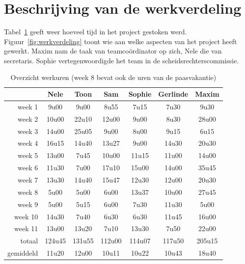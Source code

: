 \documentclass[eind]{penoverslag}
\begin{document}
\section{Beschrijving van de werkverdeling}
\label{Asec:werkverdeling}
Tabel~\ref{tab:werkuren} geeft weer hoeveel tijd in het project gestoken werd. Figuur~\ref{fig:werkverdeling} toont wie aan welke aspecten van het project heeft gewerkt.
Maxim nam de taak van teamco\"ordinator op zich, Nele die van secretaris. Sophie vertegenwoordigde het team in de scheidsrechterscommissie.

\begin{table}[h]
\begin{center}
    \begin{tabular}{ r | c  c  c  c  c  c}
     & Nele & Toon & Sam & Sophie & Gerlinde & Maxim \\ \hline
    week 1 & 9u00 & 9u00 & 8u55 & 7u15 & 7u30 & 9u30\\
   	week 2 & 10u00 & 22u10 & 12u00 & 9u00 & 8u30 & 28u00\\
	week 3 & 14u00 & 25u05 & 9u00 & 8u00 & 9u15 & 6u15\\
	week 4 & 16u15 & 14u40 & 13u27 & 9u00 & 14u30 & 20u30\\
	week 5 & 13u00 & 7u45 & 10u00 & 11u15 & 11u00 & 14u00\\
	week 6 & 11u30 & 7u00 & 17u10 & 15u00 & 14u00 & 35u45\\
	week 7 & 13u30 & 14u40 & 15u47 & 12u30 & 12u00 & 20u30\\
	week 8 & 5u00 & 5u00 & 6u00 & 13u37 & 10u00 & 27u45\\
	week 9 & 5u00 & 5u15 & 6u00 & 7u30 & 11u30 & 5u00\\
	week 10 & 14u30 & 7u40 & 6u30 & 6u30 & 11u45 & 16u00\\
	week 11 & 13u00 & 13u20 & 7u10 & 13u30 & 7u50 & 22u00\\ \hline
	totaal & 124u45 & 131u55 & 112u00 & 114u07 & 117u50 & 205u15 \\
	gemiddeld & 11u20 & 12u00 & 10u11 & 10u22 & 10u43 & 18u40
    \end{tabular}
    \caption{Overzicht werkuren (week 8 bevat ook de uren van de paasvakantie)}
    \label{tab:werkuren}
\end{center}
\end{table}
\end{document}
